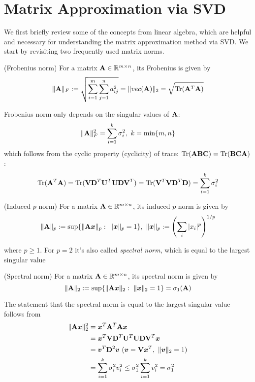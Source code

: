 \documentclass[../book-template.tex]{subfiles}
\begin{document}
\section{Matrix Approximation via SVD}
We first briefly review some of the concepts from linear algebra, which are helpful and necessary for understanding the matrix approximation method via SVD. We start by revisiting two frequently used matrix norms.
\begin{definition}
	(Frobenius norm) For a matrix ${\bf A}\in \mathbb{R}^{m \times n}$, its Frobenius is given by
	\begin{equation*}
		\|{\bf A}\|_F :=\sqrt{\sum_{i=1}^{m}\sum_{j=1}^{n}a_{ij}^2}=\|vec({\bf A})\|_2=\sqrt{\operatorname{Tr}({\bf A}^T{\bf A})}
	\end{equation*}
\end{definition}
Frobenius norm only depends on the singular values of ${\bf A}$:
\begin{equation*}
	\|{\bf A}\|_F^2 = \sum_{i=1}^{k}\sigma_i^2,\ k=\min\{m,n\}
\end{equation*}
which follows from the cyclic property (cyclicity) of trace: $\operatorname{Tr}({\bf ABC})=\operatorname{Tr}({\bf BCA})$:
\begin{equation*}
	\operatorname{Tr}({\bf A}^T{\bf A}) = \operatorname{Tr}({\bf VD}^T{\bf U}^T{\bf UDV}^T)=\operatorname{Tr}({\bf V}^T{\bf VD}^T{\bf D}) = \sum_{i=1}^{k}\sigma_i^2
\end{equation*}
\begin{definition}
	(Induced $p$-norm) For a matrix ${\bf A}\in \mathbb{R}^{m \times n}$, its induced $p$-norm is given by
	\begin{equation*}
	\|{\bf A}\|_p :=\sup\{\|{\bf A}\bm{x}\|_p:\ \|\bm{x}\|_p=1\},\ \|\bm{x}\|_p:=\left(\sum_{i}|x_i|^p\right)^{1/p}
	\end{equation*}
\end{definition}
where $p \geq 1$. For $p=2$ it's also called \emph{spectral norm}, which is equal to the largest singular value
\begin{definition}
	(Spectral norm) For a matrix ${\bf A}\in \mathbb{R}^{m \times n}$, its spectral norm is given by
	\begin{equation*}
	\|{\bf A}\|_2 :=\sup\{\|{\bf A}\bm{x}\|_2:\ \|\bm{x}\|_2=1\}=\sigma_1({\bf A})
	\end{equation*}
\end{definition}
The statement that the spectral norm is equal to the largest singular value follows from
\begin{align*}
	\|{\bf A}\bm{x}\|_2^2 
	&= \bm{x}^T{\bf A}^T{\bf A}\bm{x}\\
	&=  \bm{x}^T{\bf VD}^T{\bf U}^T{\bf UDV}^T\bm{x}\\
	&= \bm{v}^T{\bf D}^2\bm{v}\ (\bm{v} = {\bf V}\bm{x}^T,\ \|\bm{v}\|_2=1)\\
	&= \sum_{i=1}^{k} \sigma_i^2v_i^2\leq \sigma_1^2\sum_{i=1}^{k}v_i^2 = \sigma_1^2
\end{align*}
\end{document}
